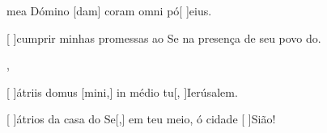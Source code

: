 {  {\item {} mea Dómino [dam] coram omni pó[ ]{e}ius.~\Antiphona}%
    {\item {}[ ]{cum}prir minhas promessas ao Se na presença de seu povo do.~\Antiphona},
  {\item {}[ ]{á}triis domus [mini,] in médio tu[, ]{Ie}{rú}salem.~\Antiphona}%
    {\item {}[ ]{á}trios da casa do Se[,] em teu meio, ó cidade [ ]{Si}{ão}!~\Antiphona}
}